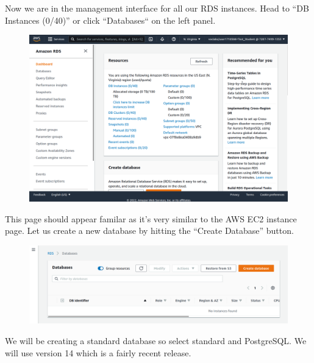 \documentclass{csse4400}
\begin{document}
Now we are in the management interface for all our RDS instances.
Head to ``DB Instances (0/40)'' or click ``Databases`` on the left panel.

\begin{figure}[H]
\includegraphics[width=\textwidth]{images/aws_2}
\end{figure}

This page should appear familar as it's very similar to the AWS EC2 instance page.
Let us create a new database by hitting the ``Create Database'' button.

\begin{figure}[H]
\includegraphics[width=\textwidth]{images/aws_3}
\end{figure}



We will be creating a standard database so select standard and PostgreSQL.
We will use version 14 which is a fairly recent release.
\end{document}
